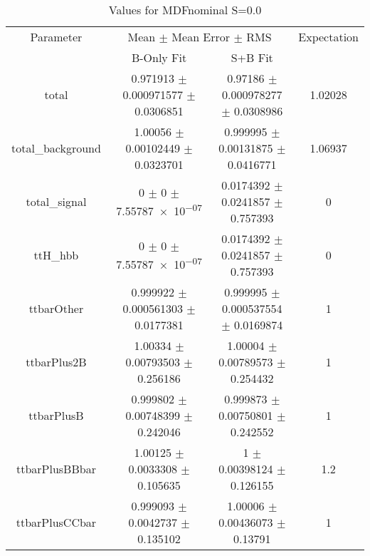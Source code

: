 \begin{table}
\centering
\caption{Values for MDFnominal S=0.0}
\begin{tabular}{cccc}
\toprule
Parameter & \multicolumn{2}{c}{Mean $\pm$ Mean Error $\pm$ RMS} & Expectation\\
 & B-Only Fit & S+B Fit & \\
\midrule
total & \num{0.971913} $\pm$ \num{0.000971577} $\pm$ \num{0.0306851} & \num{0.97186} $\pm$ \num{0.000978277} $\pm$ \num{0.0308986} & \num{1.02028}\\
total\_background & \num{1.00056} $\pm$ \num{0.00102449} $\pm$ \num{0.0323701} & \num{0.999995} $\pm$ \num{0.00131875} $\pm$ \num{0.0416771} & \num{1.06937}\\
total\_signal & \num{0} $\pm$ \num{0} $\pm$ \num{7.55787e-07} & \num{0.0174392} $\pm$ \num{0.0241857} $\pm$ \num{0.757393} & \num{0}\\
ttH\_hbb & \num{0} $\pm$ \num{0} $\pm$ \num{7.55787e-07} & \num{0.0174392} $\pm$ \num{0.0241857} $\pm$ \num{0.757393} & \num{0}\\
ttbarOther & \num{0.999922} $\pm$ \num{0.000561303} $\pm$ \num{0.0177381} & \num{0.999995} $\pm$ \num{0.000537554} $\pm$ \num{0.0169874} & \num{1}\\
ttbarPlus2B & \num{1.00334} $\pm$ \num{0.00793503} $\pm$ \num{0.256186} & \num{1.00004} $\pm$ \num{0.00789573} $\pm$ \num{0.254432} & \num{1}\\
ttbarPlusB & \num{0.999802} $\pm$ \num{0.00748399} $\pm$ \num{0.242046} & \num{0.999873} $\pm$ \num{0.00750801} $\pm$ \num{0.242552} & \num{1}\\
ttbarPlusBBbar & \num{1.00125} $\pm$ \num{0.0033308} $\pm$ \num{0.105635} & \num{1} $\pm$ \num{0.00398124} $\pm$ \num{0.126155} & \num{1.2}\\
ttbarPlusCCbar & \num{0.999093} $\pm$ \num{0.0042737} $\pm$ \num{0.135102} & \num{1.00006} $\pm$ \num{0.00436073} $\pm$ \num{0.13791} & \num{1}\\
\bottomrule
\end{tabular}
\end{table}